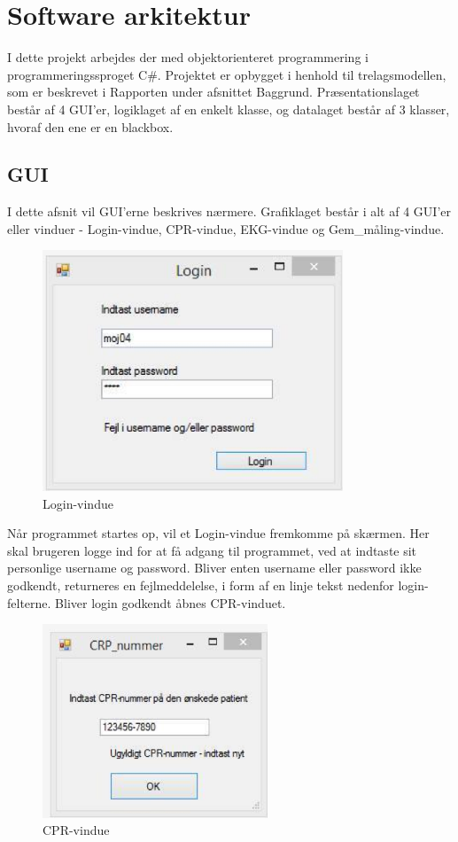 \section{Software arkitektur}
I dette projekt arbejdes der med objektorienteret programmering i programmeringssproget C\#. Projektet er opbygget i henhold til trelagsmodellen, som er beskrevet i Rapporten under afsnittet Baggrund. Præsentationslaget består af 4 GUI’er, logiklaget af en enkelt klasse, og datalaget består af 3 klasser, hvoraf den ene er en blackbox.

\subsection{GUI}
I dette afsnit vil GUI’erne beskrives nærmere. Grafiklaget består i alt af 4 GUI’er eller vinduer - Login-vindue, CPR-vindue, EKG-vindue og Gem\_måling-vindue.

\begin{figure}[H]
	\centering
	\includegraphics[width=0.8\textwidth]{Figurer/Snip20150430_38}
	\caption{Login-vindue}
\end{figure}

Når programmet startes op, vil et Login-vindue fremkomme på skærmen. Her skal brugeren logge ind for at få adgang til programmet, ved at indtaste sit personlige username og password. Bliver enten username eller password ikke godkendt, returneres en fejlmeddelelse, i form af en linje tekst nedenfor login-felterne. Bliver login godkendt åbnes CPR-vinduet.

\begin{figure}[H]
	\centering
	\includegraphics[width=0.6\textwidth]{Figurer/Snip20150430_39}
	\caption{CPR-vindue}
\end{figure} 

